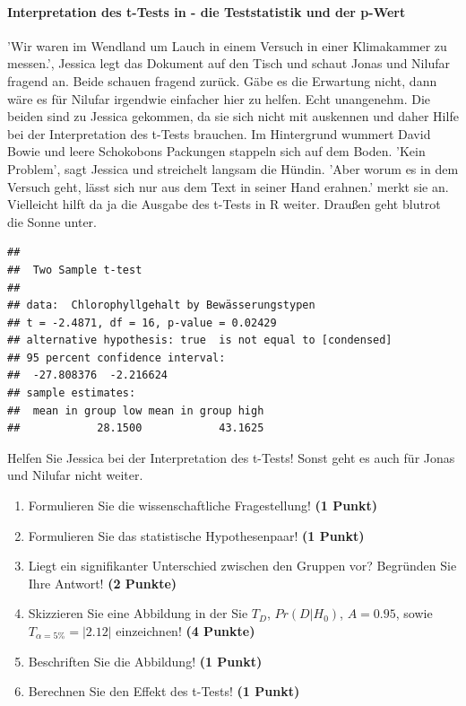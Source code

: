 \documentclass[a4paper, 9pt]{scrartcl}\usepackage[]{graphicx}\usepackage[]{xcolor}
\makeatletter
\newenvironment{kframe}{%
 \def\at@end@of@kframe{}%
 \ifinner\ifhmode%
  \def\at@end@of@kframe{\end{minipage}}%
  \begin{minipage}{\columnwidth}%
 \fi\fi%
 \def\FrameCommand##1{\hskip\@totalleftmargin \hskip-\fboxsep
 \colorbox{shadecolor}{##1}\hskip-\fboxsep
     \hskip-\linewidth \hskip-\@totalleftmargin \hskip\columnwidth}%
 \MakeFramed {\advance\hsize-\width
   \@totalleftmargin\z@ \linewidth\hsize
   \@setminipage}}%
 {\par\unskip\endMakeFramed%
 \at@end@of@kframe}
\newenvironment{knitrout}{}{} %
\makeatother
\begin{document}
\paragraph{Interpretation des t-Tests in \Rlogo - die Teststatistik und der p-Wert}


'Wir waren im Wendland um Lauch in einem Versuch in einer Klimakammer zu messen.', Jessica legt das Dokument auf den Tisch und schaut Jonas und Nilufar fragend an. Beide schauen fragend zurück. Gäbe es die Erwartung nicht, dann wäre es für Nilufar irgendwie einfacher hier zu helfen. Echt unangenehm. Die beiden sind zu Jessica gekommen, da sie sich nicht mit \Rlogo auskennen und daher Hilfe bei der Interpretation des t-Tests brauchen. Im Hintergrund wummert David Bowie und leere Schokobons Packungen stappeln sich auf dem Boden. 'Kein Problem', sagt Jessica und streichelt langsam die Hündin. 'Aber worum es in dem Versuch geht, lässt sich nur aus dem Text in seiner Hand erahnen.' merkt sie an. Vielleicht hilft da ja die Ausgabe des t-Tests in R weiter. Draußen geht blutrot die Sonne unter.

\begin{knitrout}
\color{fgcolor}\begin{kframe}
\begin{verbatim}
## 
## 	Two Sample t-test
## 
## data:  Chlorophyllgehalt by Bewässerungstypen
## t = -2.4871, df = 16, p-value = 0.02429
## alternative hypothesis: true  is not equal to [condensed]
## 95 percent confidence interval:
##  -27.808376  -2.216624
## sample estimates:
##  mean in group low mean in group high 
##            28.1500            43.1625
\end{verbatim}
\end{kframe}
\end{knitrout}

Helfen Sie Jessica bei der Interpretation des t-Tests! Sonst geht es auch für Jonas und Nilufar nicht weiter.
  
\begin{enumerate}
  \item Formulieren Sie die wissenschaftliche Fragestellung! \textbf{(1 Punkt)}
  \item Formulieren Sie das statistische Hypothesenpaar! \textbf{(1 Punkt)}
\item Liegt ein signifikanter Unterschied zwischen den Gruppen vor? Begründen Sie Ihre Antwort! \textbf{(2 Punkte)}
\item Skizzieren Sie eine Abbildung in der Sie $T_{D}$, $Pr(D|H_0)$, $A=0.95$, sowie $T_{\alpha=5\%} = |2.12|$ einzeichnen! \textbf{(4 Punkte)}
\item Beschriften Sie die Abbildung! \textbf{(1 Punkt)}  
\item Berechnen Sie den Effekt des t-Tests! \textbf{(1 Punkt)}
\end{enumerate} 
\clearpage
\end{document}
